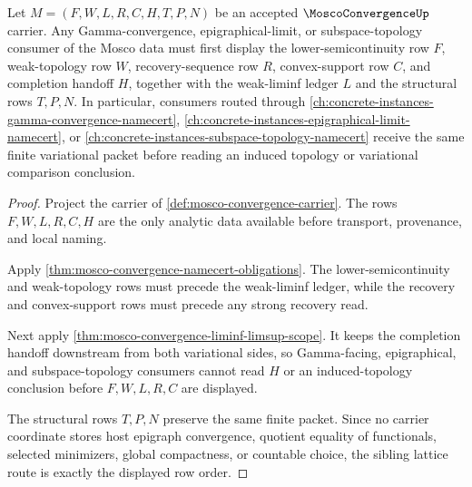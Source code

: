 \begin{theorem}
\label{thm:mosco-convergence-subspace-topology-route}
Let $M=(F,W,L,R,C,H,T,P,N)$ be an accepted $\MoscoConvergenceUp$ carrier. Any Gamma-convergence, epigraphical-limit, or subspace-topology consumer of the Mosco data must first display the lower-semicontinuity row $F$, weak-topology row $W$, recovery-sequence row $R$, convex-support row $C$, and completion handoff $H$, together with the weak-liminf ledger $L$ and the structural rows $T,P,N$. In particular, consumers routed through \autoref{ch:concrete-instances-gamma-convergence-namecert}, \autoref{ch:concrete-instances-epigraphical-limit-namecert}, or \autoref{ch:concrete-instances-subspace-topology-namecert} receive the same finite variational packet before reading an induced topology or variational comparison conclusion.
\end{theorem}
\begin{proof}
Project the carrier of \autoref{def:mosco-convergence-carrier}. The rows $F,W,L,R,C,H$ are the only analytic data available before transport, provenance, and local naming.

Apply \autoref{thm:mosco-convergence-namecert-obligations}. The lower-semicontinuity and weak-topology rows must precede the weak-liminf ledger, while the recovery and convex-support rows must precede any strong recovery read.

Next apply \autoref{thm:mosco-convergence-liminf-limsup-scope}. It keeps the completion handoff downstream from both variational sides, so Gamma-facing, epigraphical, and subspace-topology consumers cannot read $H$ or an induced-topology conclusion before $F,W,L,R,C$ are displayed.

The structural rows $T,P,N$ preserve the same finite packet. Since no carrier coordinate stores host epigraph convergence, quotient equality of functionals, selected minimizers, global compactness, or countable choice, the sibling lattice route is exactly the displayed row order.
\end{proof}


